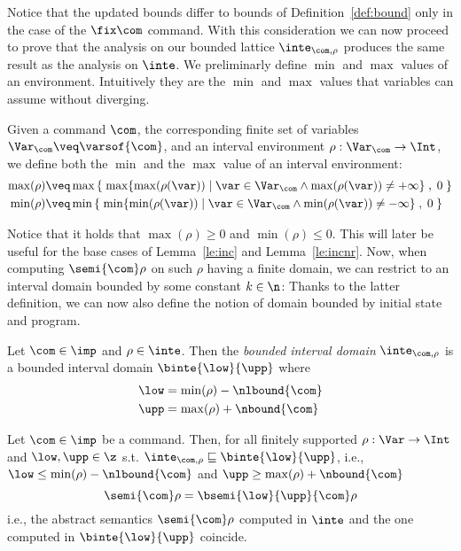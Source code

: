 Notice that the updated bounds differ to bounds of
Definition~\ref{def:bound} only in the case of the \(\fix\com\)
command.  With this consideration we can now proceed to prove that the
analysis on our bounded lattice \(\inte_{\com,\rho}\) produces the
same result as the analysis on \(\inte\).  We preliminarly define
\(\min\) and \(\max\) values of an environment. Intuitively they are
the \(\min\) and \(\max\) values that variables can assume without
diverging.

\begin{definition}\label{def:minmax}
  Given a command \(\com\), the corresponding finite set of variables
  \(\Var_{\com} \veq \varsof{\com}\), and an interval environment
  \(\rho : \Var_{\com} \to \Int\), we define both the \(\min\) and the
  \(\max\) value of an interval environment:
  \begin{align*}
    \max(\rho) & \veq \max\left\{\; \max \{ \max(\rho(\var)) \mid \var \in \Var_{\com} \land \max(\rho(\var)) \neq + \infty\} \; , \; 0 \; \right\} \\
    \min(\rho) & \veq \min\left\{\; \min \{ \min(\rho(\var)) \mid \var \in \Var_{\com} \land \min(\rho(\var)) \neq - \infty\} \; , \; 0 \; \right\}
  \end{align*}
\end{definition}
% 
Notice that it holds that \(\max(\rho) \geq 0\) and
\(\min(\rho) \leq 0\). This will later be useful for the base cases of
Lemma~\ref{le:inc} and Lemma~\ref{le:incnr}.  Now, when computing
\(\semi{\com} \rho\) on such \(\rho\) having a finite domain,
we can restrict to an interval domain bounded by some constant
\(k\in\n\):
Thanks to the latter definition, we can now also define the
notion of domain bounded by initial state and program.

\begin{definition}\label{def:boundedbycom}
  Let \(\com\in\imp\) and \(\rho \in \inte\). Then the \emph{bounded
    interval domain} \(\inte_{\com,\rho}\) is a bounded interval
  domain \(\binte{\low}{\upp}\) where
  \begin{align*}
    \low & = \min(\rho) - \nlbound{\com} \\
    \upp & = \max(\rho) + \nbound{\com}
  \end{align*}
\end{definition}
\begin{theorem}\label{th:bounded}
  Let \(\com\in \imp\) be a command. Then, for all finitely supported
  \(\rho : \Var \to \Int\) and \(\low, \upp\in \z\) s.t.
  \(\inte_{\com,\rho} \sqsubseteq \binte{\low}{\upp}\), i.e.,
  \(\low \leq \min(\rho) - \nlbound{\com}\) and
  \(\upp \geq \max(\rho) + \nbound{\com}\)
  \begin{equation}\label{eq:equal}
    \semi{\com}\rho = \bsemi{\low}{\upp}{\com}\rho
  \end{equation}
  i.e., the abstract semantics \(\semi{\com} \rho\)
  computed in \(\inte\) and the one computed in \(\binte{\low}{\upp}\)
  coincide.
\end{theorem}

